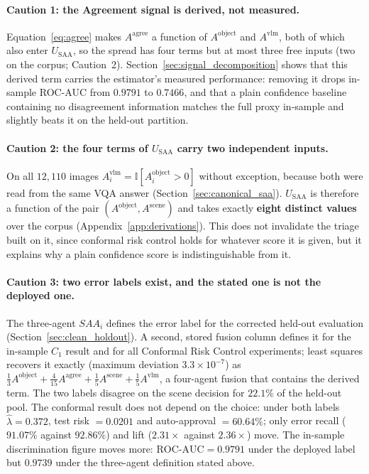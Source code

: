 \documentclass[12pt,a4paper]{report}
\begin{document}
\paragraph{Caution 1: the Agreement signal is derived, not measured.}
Equation~\ref{eq:agree} makes $A^{\text{agree}}$ a function of $A^{\text{object}}$ and $A^{\text{vlm}}$, both of which also enter $U_{\text{SAA}}$, so the spread has four terms but at most three free inputs (two on the corpus; Caution~2). Section~\ref{sec:signal_decomposition} shows that this derived term carries the estimator's measured performance: removing it drops in-sample ROC-AUC from $0.9791$ to $0.7466$, and that a plain confidence baseline containing no disagreement information matches the full proxy in-sample and slightly beats it on the held-out partition.

\paragraph{Caution 2: the four terms of $U_{\text{SAA}}$ carry two independent inputs.} On all $12{,}110$ images $A_i^{\text{vlm}} = \mathbb{I}[A_i^{\text{object}} > 0]$ without exception, because both were read from the same VQA answer (Section~\ref{sec:canonical_saa}). $U_{\text{SAA}}$ is therefore a function of the pair $(A^{\text{object}}, A^{\text{scene}})$ and takes exactly \textbf{eight distinct values} over the corpus (Appendix~\ref{app:derivations}). This does not invalidate the triage built on it, since conformal risk control holds for whatever score it is given, but it explains why a plain confidence score is indistinguishable from it.

\paragraph{Caution 3: two error labels exist, and the stated one is not the deployed one.}
The three-agent $SAA_i$ defines the error label for the corrected held-out evaluation (Section~\ref{sec:clean_holdout}). A second, stored fusion column defines it for the in-sample $C_1$ result and for all Conformal Risk Control experiments; least squares recovers it exactly (maximum deviation $3.3\times10^{-7}$) as $\tfrac{1}{3} A^{\text{object}} + \tfrac{4}{15} A^{\text{agree}} + \tfrac{1}{5} A^{\text{scene}} + \tfrac{1}{5} A^{\text{vlm}}$, a four-agent fusion that contains the derived term. The two labels disagree on the scene decision for $22.1\%$ of the held-out pool. The conformal result does not depend on the choice: under both labels $\hat\lambda = 0.372$, test risk $= 0.0201$ and auto-approval $= 60.64\%$; only error recall ($91.07\%$ against $92.86\%$) and lift ($2.31\times$ against $2.36\times$) move. The in-sample discrimination figure moves more: $\text{ROC-AUC} = 0.9791$ under the deployed label but $0.9739$ under the three-agent definition stated above.
\end{document}
